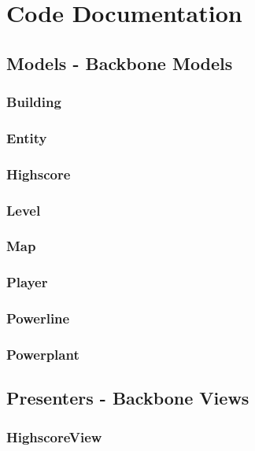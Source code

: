 \chapter{Code Documentation}
\clearpage 

\section{Models - Backbone Models}

	\subsection*{Building}

	\subsection*{Entity}

	\subsection*{Highscore}

	\subsection*{Level}

	\subsection*{Map}

	\subsection*{Player}

	\subsection*{Powerline}

	\subsection*{Powerplant}

	\clearpage

\section{Presenters - Backbone Views}
	
	\subsection*{HighscoreView}

